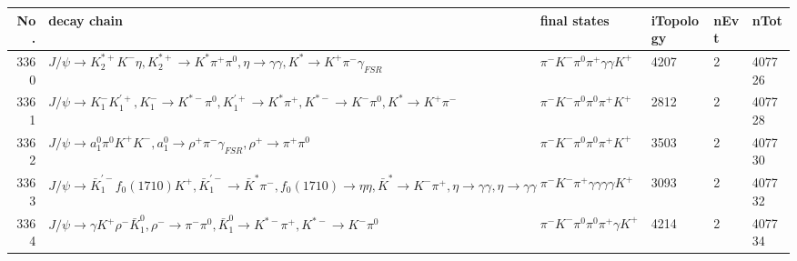 \begin{table}[htbp] 
\begin{center}
\begin{small}
\begin{tabular}{rlllll}\hline\hline
 No. & decay chain & final states &  iTopology & nEvt & nTot \\\hline
3360&$J/\psi       \rightarrow K_2^{*+}       K^{-}          \eta          , K_2^{*+}        \rightarrow K^{*}          \pi^{+}        \pi^{0}        , \eta           \rightarrow \gamma       \gamma       , K^{*}           \rightarrow K^{+}          \pi^{-}        \gamma_{FSR} $&$\pi^{-}        K^{-}          \pi^{0}        \pi^{+}        \gamma       \gamma       K^{+}          $& 4207&    2&407726\\
3361&$J/\psi       \rightarrow K_{1}^{-}      K_1^{'+}      , K_{1}^{-}       \rightarrow K^{*-}         \pi^{0}        , K_1^{'+}       \rightarrow K^{*}          \pi^{+}        , K^{*-}          \rightarrow K^{-}          \pi^{0}        , K^{*}           \rightarrow K^{+}          \pi^{-}        $&$\pi^{-}        K^{-}          \pi^{0}        \pi^{0}        \pi^{+}        K^{+}          $& 2812&    2&407728\\
3362&$J/\psi       \rightarrow a_{1}^{0}      \pi^{0}        K^{+}          K^{-}          , a_{1}^{0}       \rightarrow \rho^{+}      \pi^{-}        \gamma_{FSR} , \rho^{+}       \rightarrow \pi^{+}        \pi^{0}        $&$\pi^{-}        K^{-}          \pi^{0}        \pi^{0}        \pi^{+}        K^{+}          $& 3503&    2&407730\\
3363&$J/\psi       \rightarrow \bar{K}_1^{'-}f_{0}(1710)    K^{+}          , \bar{K}_1^{'-} \rightarrow \bar{K}^{*}   \pi^{-}        , f_{0}(1710)     \rightarrow \eta          \eta          , \bar{K}^{*}    \rightarrow K^{-}          \pi^{+}        , \eta           \rightarrow \gamma       \gamma       , \eta           \rightarrow \gamma       \gamma       $&$\pi^{-}        K^{-}          \pi^{+}        \gamma       \gamma       \gamma       \gamma       K^{+}          $& 3093&    2&407732\\
3364&$J/\psi       \rightarrow \gamma       K^{+}          \rho^{-}      \bar{K}_1^{0} , \rho^{-}       \rightarrow \pi^{-}        \pi^{0}        , \bar{K}_1^{0}  \rightarrow K^{*-}         \pi^{+}        , K^{*-}          \rightarrow K^{-}          \pi^{0}        $&$\pi^{-}        K^{-}          \pi^{0}        \pi^{0}        \pi^{+}        \gamma       K^{+}          $& 4214&    2&407734\\

\end{tabular}
\end{small}
\end{center}
\end{table}
